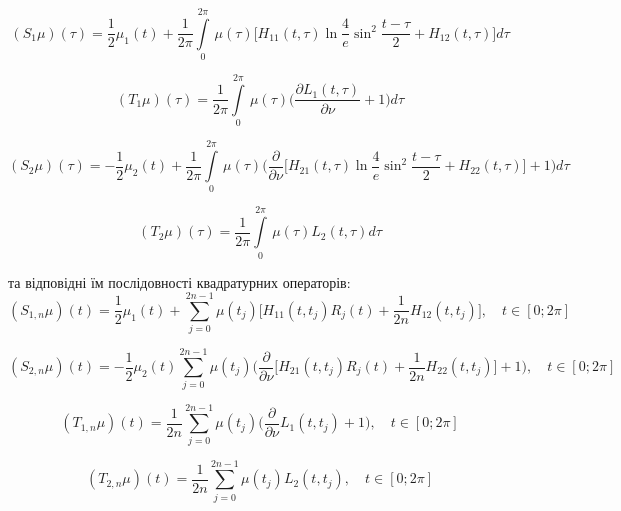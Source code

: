 \documentclass[a4 paper,12pt,ukrainian]{report}
\begin{document}
\begin{equation*}
(S_{1}\mu)(\tau)=\frac{1}{2}\mu_1(t) + \frac{1}{2\pi}\int\limits_{0}^{2\pi} \,\mu(\tau)\Big[H_{11}(t,\tau)\ln{\frac{4}{e}\sin^2\frac{t-\tau}{2}}+H_{12}(t,\tau)\Big]d\tau
\end{equation*}

\begin{equation*}
(T_{1}\mu)(\tau)=\frac{1}{2\pi}\int\limits_{0}^{2\pi} \,\mu(\tau)\bigg(\frac{\partial L_{1}(t,\tau)}{\partial \nu} + 1\bigg)d\tau
\end{equation*}

\begin{equation*}
(S_{2}\mu)(\tau)=-\frac{1}{2}\mu_2(t) + \frac{1}{2\pi}\int\limits_{0}^{2\pi} \,\mu(\tau)\bigg(\frac{\partial}{\partial\nu}\Big[H_{21}(t,\tau)\ln{\frac{4}{e}\sin^2\frac{t-\tau}{2}}+H_{22}(t,\tau)\Big] + 1\bigg)d\tau
\end{equation*}

\begin{equation*}
(T_{2}\mu)(\tau)=\frac{1}{2\pi}\int\limits_{0}^{2\pi} \,\mu(\tau)L_{2}(t,\tau)d\tau
\end{equation*}


та відповідні їм послідовності квадратурних операторів:
\begin{equation*}
(S_{1,n}\mu)(t)=\frac{1}{2}\mu_1(t)+\sum\limits_{j=0}^{2n-1} \mu(t_{j})\Big[H_{11}(t,t_j)R_j(t)+\frac{1}{2n}H_{12}(t,t_j)\Big], \quad t\in[0;2\pi]
\end{equation*}

\begin{equation*}
(S_{2,n}\mu)(t)=-\frac{1}{2}\mu_2(t)\sum\limits_{j=0}^{2n-1} \mu(t_{j})\bigg(\frac{\partial}{\partial\nu}\Big[H_{21}(t,t_j)R_j(t)+\frac{1}{2n}H_{22}(t,t_j)\Big] + 1\bigg), \quad t\in[0;2\pi]
\end{equation*}

\begin{equation*}
(T_{1,n}\mu)(t)=\frac{1}{2n}\sum\limits_{j=0}^{2n-1}\mu(t_j)\bigg(\frac{\partial}{\partial\nu}L_{1}(t,t_j) + 1\bigg), \quad t\in[0;2\pi]
\end{equation*}

\begin{equation*}
(T_{2,n}\mu)(t)=\frac{1}{2n}\sum\limits_{j=0}^{2n-1}\mu(t_j)L_{2}(t,t_j), \quad t\in[0;2\pi]
\end{equation*}
\end{document}
